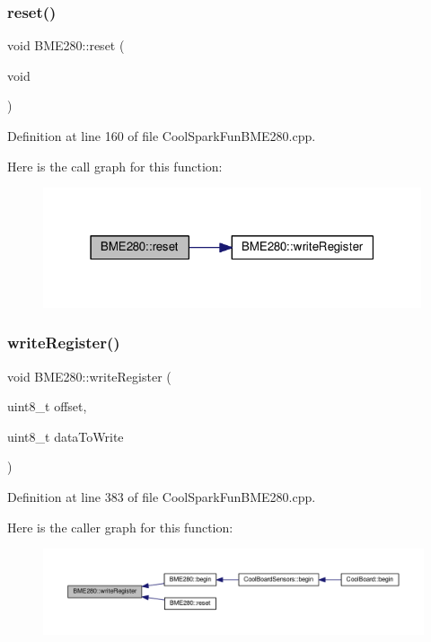\subsubsection{\texorpdfstring{reset()}{reset()}}
{\footnotesize\ttfamily void B\+M\+E280\+::reset (\begin{DoxyParamCaption}\item[{void}]{ }\end{DoxyParamCaption})}



Definition at line 160 of file Cool\+Spark\+Fun\+B\+M\+E280.\+cpp.

Here is the call graph for this function\+:
\nopagebreak
\begin{figure}[H]
\begin{center}
\leavevmode
\includegraphics[width=316pt]{class_b_m_e280_aeec5deb6daace6ae390108b4210e9df7_cgraph}
\end{center}
\end{figure}
\mbox{\label{class_b_m_e280_afcff21c342725246bf415d7f0e4d04f0}} 
\subsubsection{\texorpdfstring{write\+Register()}{writeRegister()}}
{\footnotesize\ttfamily void B\+M\+E280\+::write\+Register (\begin{DoxyParamCaption}\item[{uint8\+\_\+t}]{offset,  }\item[{uint8\+\_\+t}]{data\+To\+Write }\end{DoxyParamCaption})}



Definition at line 383 of file Cool\+Spark\+Fun\+B\+M\+E280.\+cpp.

Here is the caller graph for this function\+:
\nopagebreak
\begin{figure}[H]
\begin{center}
\leavevmode
\includegraphics[width=350pt]{class_b_m_e280_afcff21c342725246bf415d7f0e4d04f0_icgraph}
\end{center}
\end{figure}


